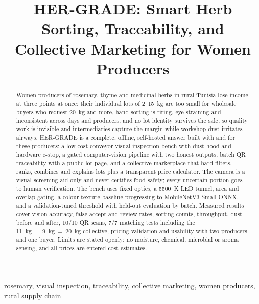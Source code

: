 \documentclass[10pt,conference,a4paper]{IEEEtran}
\begin{document}
\title{HER-GRADE: Smart Herb Sorting, Traceability, and Collective Marketing for Women Producers}
\author{}
\maketitle
\thispagestyle{fancy}
\begin{abstract}
Women producers of rosemary, thyme and medicinal herbs in rural Tunisia lose income at three points at once: their individual lots of 2--15~kg are too small for wholesale buyers who request 20~kg and more, hand sorting is tiring, eye-straining and inconsistent across days and producers, and no lot identity survives the sale, so quality work is invisible and intermediaries capture the margin while workshop dust irritates airways. HER-GRADE is a complete, offline, self-hosted answer built with and for these producers: a low-cost conveyor visual-inspection bench with dust hood and hardware e-stop, a gated computer-vision pipeline with two honest outputs, batch QR traceability with a public lot page, and a collective marketplace that hard-filters, ranks, combines and explains lots plus a transparent price calculator. The camera is a visual screening aid only and never certifies food safety; every uncertain portion goes to human verification. The bench uses fixed optics, a 5500~K LED tunnel, area and overlap gating, a colour-texture baseline progressing to MobileNetV3-Small ONNX, and a validation-tuned threshold with held-out evaluation by batch. Measured results cover vision accuracy, false-accept and review rates, sorting counts, throughput, dust before and after, 10/10 QR scans, 7/7 matching tests including the 11~kg~+~9~kg~=~20~kg collective, pricing validation and usability with two producers and one buyer. Limits are stated openly: no moisture, chemical, microbial or aroma sensing, and all prices are entered-cost estimates.
\end{abstract}
\begin{IEEEkeywords}
rosemary, visual inspection, traceability, collective marketing, women producers, rural supply chain
\end{IEEEkeywords}
\end{document}
